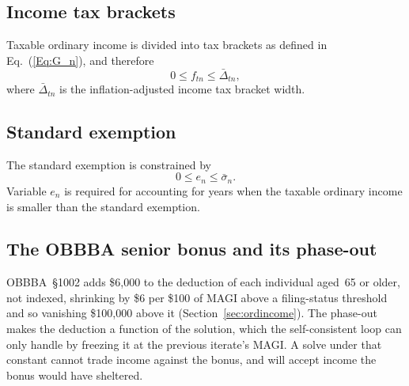 \documentclass[fleqn,12pt]{report}
\begin{document}
\subsection{Income tax brackets}
	Taxable ordinary income is divided into tax brackets as defined in Eq.~(\ref{Eq:G_n}),
	and therefore
	\begin{equation}
		\label{Eq:C2}
		0 \le f_{tn} \le \bar{\Delta}_{tn},
	\end{equation}
	where $\bar{\Delta}_{tn}$ is the inflation-adjusted income tax bracket width.

\subsection{Standard exemption}
	The standard exemption is constrained by
	\begin{equation}
		\label{Eq:StdExemp}
		0 \le e_n \le \bar{\sigma}_n.
	\end{equation}
	Variable $e_n$ is required for accounting for years when the taxable ordinary
	income is smaller than the standard exemption.

\subsection{The OBBBA senior bonus and its phase-out}
\label{Sec:SeniorBonus}
	OBBBA~\S1002 adds \$6,000 to the deduction of each individual aged~65 or older,
	not indexed, shrinking by \$6 per \$100 of MAGI above a filing-status threshold
	and so vanishing \$100,000 above it (Section~\ref{sec:ordincome}).
	The phase-out makes the deduction a function of the solution, which the
	self-consistent loop can only handle by freezing it at the previous iterate's
	MAGI.
	A solve under that constant cannot trade income against the bonus, and will
	accept income the bonus would have sheltered.
\end{document}
